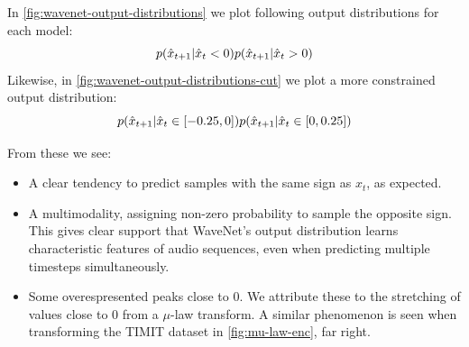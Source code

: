 In \cref{fig:wavenet-output-distributions} we plot following output distributions for each model:
\[
p(\hat{x}_{t+1} | \hat{x}_{t} < 0 )
\\
p(\hat{x}_{t+1} | \hat{x}_{t} > 0 )
\]
Likewise, in \cref{fig:wavenet-output-distributions-cut} we plot a more constrained output distribution:
\[
p(\hat{x}_{t+1} | \hat{x}_{t} \in [-0.25, 0] )
\\
p(\hat{x}_{t+1} | \hat{x}_{t}  \in [0, 0.25] )
\]


From these we see:
\begin{itemize}
    \item A clear tendency to predict samples with the same sign as $x_t$, as expected.
    \item A multimodality, assigning non-zero probability to sample the opposite sign. This gives clear support that WaveNet's output distribution learns characteristic features of audio sequences, even when predicting multiple timesteps simultaneously.
    \item Some overespresented peaks close to 0. We attribute these to the stretching of values close to 0 from a $\mu$-law transform. A similar phenomenon is seen when transforming the TIMIT dataset in \cref{fig:mu-law-enc}, far right.
\end{itemize}